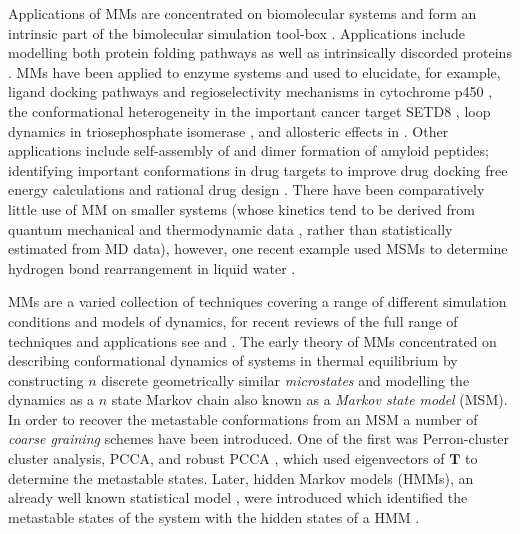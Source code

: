 Applications of MMs are concentrated on biomolecular systems and form an intrinsic part of the bimolecular simulation tool-box \cite{hugginsBiomolecularSimulationsDynamics2019}. Applications include modelling both protein folding pathways \cite{singhalUsingPathSampling2004,swopeDescribingProteinFolding2004} as well as intrinsically discorded proteins \cite{schorAnalyticalMethodsStructural2016a}. 
MMs have been applied to enzyme systems and used to elucidate, for example, ligand docking pathways \cite{ahalawatMappingSubstrateRecognition2018a} and regioselectivity mechanisms in cytochrome p450 \cite{dodaniDiscoveryRegioselectivitySwitch2016a}, the conformational heterogeneity in the important cancer target SETD8 \cite{chenDynamicConformationalLandscape2019a}, loop dynamics in  triosephosphate isomerase \cite{LoopMotionTriosephosphate}, and allosteric effects in \cite{wapeesittipanAllostericEffectsCyclophilin2019}. Other applications include self-assembly of  \cite{senguptaAutomatedMarkovState2019} and dimer formation \cite{leahyCoarseMasterEquations2016} of amyloid peptides; identifying important conformations in drug targets to improve drug docking free energy calculations  \cite{amaroEnsembleDockingDrug2018} and rational drug design \cite{gervasioBiomolecularSimulationsStructureBased2019}. There have been comparatively little use of MM on smaller systems (whose kinetics tend to be derived from quantum mechanical and thermodynamic data \cite{glowackiMESMEROpenSourceMaster2012} \cite{pillingMasterEquationModels2003}, rather than statistically estimated from MD data), however, one recent example used MSMs to determine hydrogen bond rearrangement in liquid water \cite{schulzCollectiveHydrogenbondRearrangement2018}. 

MMs are a varied collection of techniques covering a range of different simulation conditions and models of dynamics, for recent reviews of the full range of techniques and applications see \cite{husicMarkovStateModels2018} and \cite{noeMarkovModelsMolecular2019b}.  The early theory of MMs concentrated on describing conformational dynamics of systems in thermal equilibrium by constructing $n$ discrete geometrically similar \emph{microstates} and modelling the dynamics as a $n$ state Markov chain \cite{singhalUsingPathSampling2004} \cite{swopeDescribingProteinFolding2004} \cite{prinzMarkovModelsMolecular2011} also known as a \emph{Markov state model} (MSM). In order to recover the metastable conformations from an MSM a number of \emph{coarse graining} schemes have been introduced. One of the first was Perron-cluster cluster analysis, PCCA,  \cite{deuflhardIdentificationAlmostInvariant2000a} and robust PCCA   \cite{deuflhardRobustPerronCluster2005b}, which used eigenvectors of $\mathbf{T}$ to determine the metastable states. Later, hidden Markov models (HMMs), an already well known statistical model \cite{rabinerTutorialHiddenMarkov1989}, were introduced  which  identified the metastable states of the system with the hidden states of a HMM \cite{noeMarkovModelsMolecular2019b}. 


